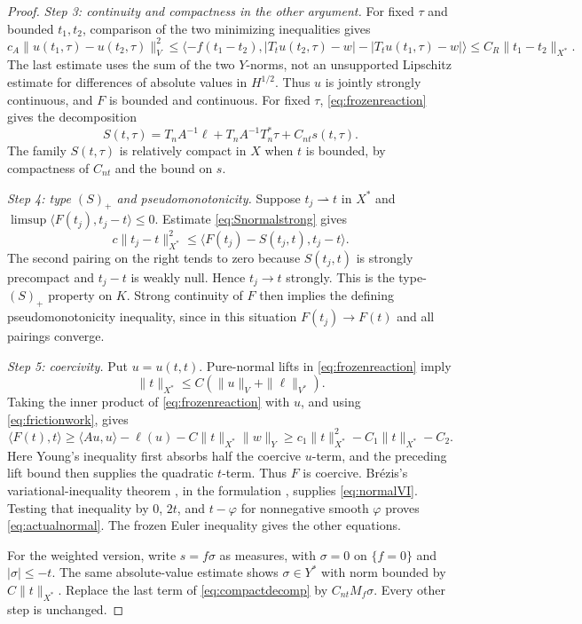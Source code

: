 \documentclass[11pt,a4paper]{article}
\theoremstyle{definition}\newtheorem{definition}[theorem]{Definition}
\theoremstyle{remark}\newtheorem{remark}[theorem]{Remark}
\newcommand{\ip}[2]{\langle #1,#2\rangle}
\newcommand{\weak}{\rightharpoonup}
\numberwithin{equation}{section}
\begin{document}
\begin{proof}
\emph{Step 3: continuity and compactness in the other argument.}
For fixed $\tau$ and bounded $t_1,t_2$, comparison of the two minimizing inequalities gives
\[
 c_A\|u(t_1,\tau)-u(t_2,\tau)\|_V^2
 \le\ip{-f(t_1-t_2)}{|T_tu(t_2,\tau)-w|-|T_tu(t_1,\tau)-w|}
 \le C_R\|t_1-t_2\|_{X^*}.
\]
The last estimate uses the sum of the two $Y$-norms, not an unsupported Lipschitz estimate for differences of absolute values in $H^{1/2}$. Thus $u$ is jointly strongly continuous, and $F$ is bounded and continuous.
For fixed $\tau$, \eqref{eq:frozenreaction} gives the decomposition
\begin{equation}\label{eq:compactdecomp}
 S(t,\tau)=T_nA^{-1}\ell+T_nA^{-1}T_n^*\tau+C_{nt}s(t,\tau).
\end{equation}
The family $S(t,\tau)$ is relatively compact in $X$ when $t$ is bounded, by compactness of $C_{nt}$ and the bound on $s$.

\emph{Step 4: type $(S)_+$ and pseudomonotonicity.}
Suppose $t_j\weak t$ in $X^*$ and $\limsup\ip{F(t_j)}{t_j-t}\le0$. Estimate \eqref{eq:Snormalstrong} gives
\[
 c\|t_j-t\|_{X^*}^2
 \le\ip{F(t_j)-S(t_j,t)}{t_j-t}.
\]
The second pairing on the right tends to zero because $S(t_j,t)$ is strongly precompact and $t_j-t$ is weakly null. Hence $t_j\to t$ strongly. This is the type-$(S)_+$ property on $K$. Strong continuity of $F$ then implies the defining pseudomonotonicity inequality, since in this situation $F(t_j)\to F(t)$ and all pairings converge.

\emph{Step 5: coercivity.}
Put $u=u(t,t)$. Pure-normal lifts in \eqref{eq:frozenreaction} imply
\[
 \|t\|_{X^*}\le C(\|u\|_V+\|\ell\|_{V^*}).
\]
Taking the inner product of \eqref{eq:frozenreaction} with $u$, and using \eqref{eq:frictionwork}, gives
\[
 \ip{F(t)}{t}\ge \ip{Au}{u}-\ell(u)-C\|t\|_{X^*}\|w\|_Y
 \ge c_1\|t\|_{X^*}^2-C_1\|t\|_{X^*}-C_2.
\]
Here Young's inequality first absorbs half the coercive $u$-term, and the preceding lift bound then supplies the quadratic $t$-term. Thus $F$ is coercive. Br\'ezis's variational-inequality theorem \cite[Corollary 30]{Brezis}, in the formulation \cite[Theorem A.3]{BI}, supplies \eqref{eq:normalVI}.
Testing that inequality by $0$, $2t$, and $t-\varphi$ for nonnegative smooth $\varphi$ proves \eqref{eq:actualnormal}. The frozen Euler inequality gives the other equations.

For the weighted version, write $s=f\sigma$ as measures, with $\sigma=0$ on $\{f=0\}$ and $|\sigma|\le-t$. The same absolute-value estimate shows $\sigma\in Y^*$ with norm bounded by $C\|t\|_{X^*}$. Replace the last term of \eqref{eq:compactdecomp} by $C_{nt}M_f\sigma$. Every other step is unchanged.
\end{proof}
\end{document}
